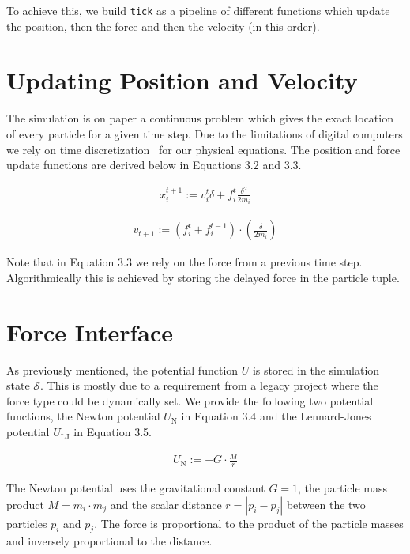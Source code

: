 \documentclass[11pt,
               a4paper,
               bibtotoc,
               idxtotoc,
               headsepline,
               footsepline,
               footexclude,
               BCOR12mm,
               DIV13,
               openany,   %
               ]
               {scrbook}
\begin{document}
To achieve this, we build \texttt{tick} as a pipeline of different functions which update the position, then the force and then the velocity (in this order).

\section{Updating Position and Velocity}

The simulation is on paper a continuous problem which gives the exact location of every particle for a given time step. Due to the limitations of digital computers we rely on time discretization~\cite{numerical-simulation} for our physical equations. The position and force update functions are derived below in Equations 3.2 and 3.3.

\begin{align}
x_i^{t+1} := v_i^t \delta + f_i^t \frac{{\delta}^2}{2m_i}
\label{pipeline-update-position}
\end{align}

\begin{align}
v_{t+1} := \left(f_i^t + f_i^{t-1}\right) \cdot \left(\frac{\delta}{2m_i}\right)
\label{pipeline-update-velocity}
\end{align}

Note that in Equation 3.3 we rely on the force from a previous time step. Algorithmically this is achieved by storing the delayed force
in the particle tuple.

\section{Force Interface}

As previously mentioned, the potential function $U$ is stored in the simulation state $\mathcal S$. This is mostly due to a requirement from a legacy project where the force type could be dynamically set. We provide the following two potential functions, the Newton potential $U_\text{N}$ in Equation 3.4 and the Lennard-Jones potential $U_\text{LJ}$ in Equation 3.5.

\begin{align}
U_\text{N} := - G \cdot \frac{M}{r}
\label{potential-newton}
\end{align}

The Newton potential uses the gravitational constant $G = 1$, the particle mass product $M = m_i \cdot m_j$ and the scalar distance $r = |p_i - p_j|$ between the two particles $p_i$ and $p_j$. The force is proportional to the product of the particle masses and inversely proportional to the distance.
\end{document}
